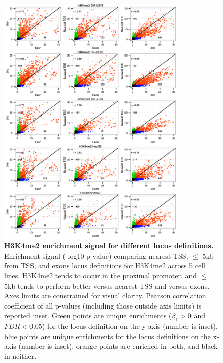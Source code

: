 \begin{figure}[ht!]
\centering
\includegraphics[width=0.8\textwidth]{chap2figs/figure2_5.pdf}
\caption[H3K4me2 enrichment signal for different locus definitions.]
{
\textbf{H3K4me2 enrichment signal for different locus definitions.} Enrichment signal (-log10 p-value) comparing nearest TSS, $\leq$ 5kb from TSS, and exons locus definitions for H3K4me2 across 5 cell lines. H3K4me2 tends to occur in the proximal promoter, and $\leq$ 5kb tends to perform better versus nearest TSS and versus exons. Axes limits are constrained for visual clarity. Pearson correlation coefficient of all p-values (including those outside axis limits) is reported inset. Green points are unique enrichments ($\beta_1 > 0$ and $FDR < 0.05$) for the locus definition on the y-axis (number is inset), blue points are unique enrichments for the locus definitions on the x-axis (number is inset), orange points are enriched in both, and black in neither.
}
\label{chap2:fig:5}
\end{figure}

\newpage

